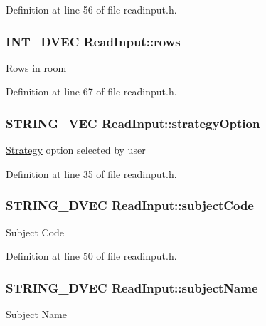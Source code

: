 \-Definition at line 56 of file readinput.\-h.

\hypertarget{classReadInput_ac853c80a2fad7a58fecde30db9fc93df}{
\subsubsection[{rows}]{\setlength{\rightskip}{0pt plus 5cm}\-I\-N\-T\-\_\-D\-V\-E\-C {\bf \-Read\-Input\-::rows}}}\label{classReadInput_ac853c80a2fad7a58fecde30db9fc93df}
\-Rows in room 

\-Definition at line 67 of file readinput.\-h.

\hypertarget{classReadInput_a0f62d76d15b123767751a22f87dc79ed}{
\subsubsection[{strategy\-Option}]{\setlength{\rightskip}{0pt plus 5cm}\-S\-T\-R\-I\-N\-G\-\_\-\-V\-E\-C {\bf \-Read\-Input\-::strategy\-Option}}}\label{classReadInput_a0f62d76d15b123767751a22f87dc79ed}
\hyperlink{classStrategy}{\-Strategy} option selected by user 

\-Definition at line 35 of file readinput.\-h.

\hypertarget{classReadInput_a5db96d61a79c6a36bcdc4907bebf8bd0}{
\subsubsection[{subject\-Code}]{\setlength{\rightskip}{0pt plus 5cm}\-S\-T\-R\-I\-N\-G\-\_\-D\-V\-E\-C {\bf \-Read\-Input\-::subject\-Code}}}\label{classReadInput_a5db96d61a79c6a36bcdc4907bebf8bd0}
\-Subject \-Code 

\-Definition at line 50 of file readinput.\-h.

\hypertarget{classReadInput_acbd2ac53fb64da88965fa5e542f2c456}{
\subsubsection[{subject\-Name}]{\setlength{\rightskip}{0pt plus 5cm}\-S\-T\-R\-I\-N\-G\-\_\-D\-V\-E\-C {\bf \-Read\-Input\-::subject\-Name}}}\label{classReadInput_acbd2ac53fb64da88965fa5e542f2c456}
\-Subject \-Name 

